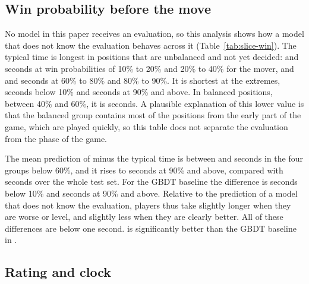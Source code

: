 \documentclass[11pt]{article}
\begin{document}
\subsection{Win probability before the move}

No model in this paper receives an evaluation, so this analysis shows how a
model that does not know the evaluation behaves across it
(Table~\ref{tab:slice-win}). The typical time is longest in positions that
are unbalanced and not yet decided:  and
 seconds at win probabilities of 10\% to 20\% and
20\% to 40\% for the mover, and  and
 seconds at 60\% to 80\% and 80\% to 90\%. It is
shortest at the extremes,  seconds below 10\% and
 seconds at 90\% and above. In balanced positions,
between 40\% and 60\%, it is  seconds. A
plausible explanation of this lower value is that the balanced group contains
most of the positions from the early part of the game, which are played
quickly, so this table does not separate the evaluation from the phase of
the game.

The mean prediction of  minus the typical time is between
 and 
seconds in the four groups below 60\%, and it rises to
 seconds at 90\% and above, compared with
 seconds over the whole
test set. For the GBDT baseline the difference is
 seconds below 10\% and
 seconds at 90\% and above. Relative to the
prediction of a model that does not know the evaluation, players thus take
slightly longer when they are worse or level, and slightly less when they are
clearly better. All of these differences are below one second.
 is significantly better than the GBDT baseline in
.

\subsection{Rating and clock}
\end{document}
